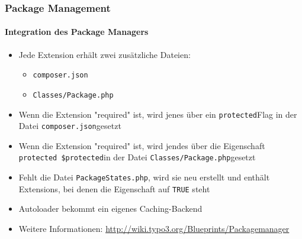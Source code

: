 
\begin{frame}[fragile]
	\frametitle{Package Management}
	\framesubtitle{Integration des Package Managers}

	\begin{itemize}

		\item Jede Extension erhält zwei zusätzliche Dateien:

			\begin{itemize}
				\item \texttt{composer.json}
				\item \texttt{Classes/Package.php}
			\end{itemize}

		\item Wenn die Extension "required" ist, wird jenes über ein
			\small\texttt{protected}\normalsize\space Flag in der Datei
			\small\texttt{composer.json}\normalsize\space gesetzt

		\item Wenn die Extension "required" ist, wird jendes über die Eigenschaft
			\small\texttt{protected \$protected}\normalsize\space in der Datei
			\small\texttt{Classes/Package.php}\normalsize\space gesetzt

		\item Fehlt die Datei \small\texttt{PackageStates.php}\normalsize, wird sie neu
			erstellt und enthält Extensions, bei denen die Eigenschaft auf \texttt{TRUE} steht

		\item Autoloader bekommt ein eigenes Caching-Backend

		\item Weitere Informationen:\newline
			\url{http://wiki.typo3.org/Blueprints/Packagemanager}

	\end{itemize}

\end{frame}


